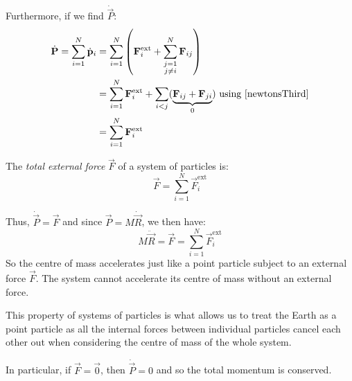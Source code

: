 \documentclass[../main.tex]{subfiles}
\begin{document}
Furthermore, if we find $\dot{\vec{P}}$:
\begin{align*}
  \dot{\vec{P}} = \sum_{i = 1}^{N} \dot{\vec{p}}_i &= \sum_{i = 1}^{N} \left(\vec{F}^\text{ext}_i + \sum_{\substack{j = 1 \\ j \neq i}}^N \vec{F}_{i j}\right) \\
                                                   &= \sum_{i = 1}^{N} \vec{F}^\text{ext}_i + \sum_{i < j} (\underbrace{\vec{F}_{i j} + \vec{F}_{j i}}_{0}) \text{ using \cref{newtonsThird}}\\
                                                   &= \sum_{i = 1}^{N} \vec{F}^{\text{ext}}_i
\end{align*}
\begin{definition}
  The \textit{total external force} $\vec{F}$ of a system of particles is:
  \[
    \vec{F} = \sum_{i = 1}^{N}  \vec{F}^{\text{ext}}_i
  \]
\end{definition}
Thus, $\dot{\vec{P}} = \vec{F}$ and since $\vec{P} = M \dot{\vec{R}}$, we then have:
\begin{equation}
  M \ddot{\vec{R}} = \vec{F} = \sum_{i = 1}^{N} \vec{F}^\text{ext}_i \label{comN2}
\end{equation}
So the centre of mass accelerates just like a point particle subject to an external force $\vec{F}$.
The system cannot accelerate its centre of mass without an external force.
\begin{remark}
  This property of systems of particles is what allows us to treat the Earth as a point particle as all the internal forces between individual particles cancel each other out when considering the centre of mass of the whole system.
\end{remark}
In particular, if $\vec{F} = \vec{0}$, then $\dot{\vec{P}} = 0$ and so the total momentum is conserved.
\end{document}
